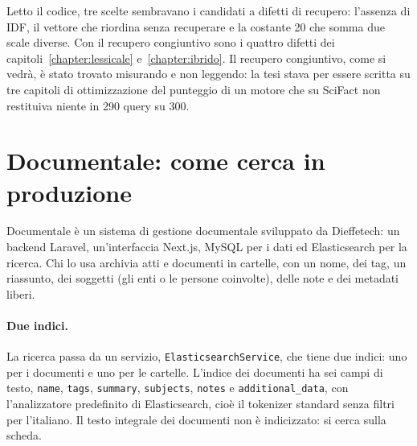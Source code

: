 Letto il codice, tre scelte sembravano i candidati a difetti di recupero:
l'assenza di IDF, il vettore che riordina senza recuperare e la costante 20 che
somma due scale diverse. Con il recupero congiuntivo sono i quattro difetti dei
capitoli~\ref{chapter:lessicale} e~\ref{chapter:ibrido}. Il recupero
congiuntivo, come si vedrà, è stato trovato misurando e non leggendo: la tesi
stava per essere scritta su tre capitoli di ottimizzazione del punteggio di un motore che su SciFact non
restituiva niente in 290 query su 300.

\section{Documentale: come cerca in produzione}\label{sec:documentale}

Documentale è un sistema di gestione documentale sviluppato da Dieffetech: un
backend Laravel, un'interfaccia Next.js, MySQL per i dati ed Elasticsearch per la
ricerca. Chi lo usa archivia atti e documenti in cartelle, con un nome, dei tag,
un riassunto, dei soggetti (gli enti o le persone coinvolte), delle note e dei
metadati liberi.

\paragraph{Due indici.} La ricerca passa da un servizio,
\texttt{ElasticsearchService}, che tiene due indici: uno per i documenti e uno
per le cartelle. L'indice dei documenti ha sei campi di testo, \texttt{name},
\texttt{tags}, \texttt{summary}, \texttt{subjects}, \texttt{notes} e
\texttt{additional\_data}, con l'analizzatore predefinito di Elasticsearch, cioè
il tokenizer standard senza filtri per l'italiano. Il testo integrale dei
documenti non è indicizzato: si cerca sulla scheda.


